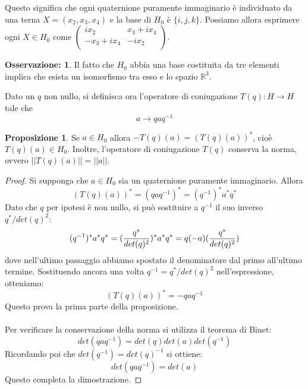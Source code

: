 \documentclass[12pt,a4paper]{report}
\theoremstyle{definition}
\theoremstyle{Theorem}
\newtheorem{Prop}[Def]{Proposizione}
\theoremstyle{definition}
\theoremstyle{definition}
\theoremstyle{definition}
\newtheorem{Obs}[Def]{Osservazione:}
\begin{document}
Questo significa che ogni quaternione puramente immaginario è individuato da una terna $X=(x_2,x_3,x_4)$ e la base di $H_0$ è $\{i,j,k\}$. Possiamo allora esprimere ogni $X\in H_0$ come
$\begin{pmatrix}
	ix_2 & x_3+ix_4\\
	-x_3+ix_4 & -ix_2\\
\end{pmatrix}$.
\begin{Obs} \label{Obs:3.4.1}
	Il fatto che $H_0$ abbia una base costituita da tre elementi implica che esista un isomorfismo tra esso e lo spazio $\mathbb{R}^3$.
\end{Obs}
Dato un $q$ non nullo, si definisca ora l'operatore di coniugazione
$T(q):H\longrightarrow H$ tale che
$$a\longrightarrow qaq^{-1}$$
\begin{Prop}
	Se $a\in H_0$ allora $-T(q)(a)=(T(q)(a))^*$, cioè $T(q)(a)\in H_0$. Inoltre, l'operatore di coniugazione $T(q)$ conserva la norma, ovvero $||T(q)(a)||=||a||$.
\end{Prop}
\begin{proof}
	Si supponga che $a\in H_0$ sia un quaternione puramente immaginario. Allora $$(T(q)(a))^*=(qaq^{-1})^*=(q^{-1})^*a^*q^*$$
	Dato che $q$ per ipotesi è non nullo, si può sostituire a $q^{-1}$ il suo inverso $q^*/det(q)^2$:
	$$(q^{-1})^*a^*q^*=({q^*\over det(q)^2})^*a^*q^*=q(-a)({q^*\over det(q)^2})$$
	dove nell'ultimo passaggio abbiamo spostato il denominatore dal primo all'ultimo termine. Sostituendo ancora una volta $q^{-1}=q^*/det(q)^2$ nell'espressione, otteniamo:
	$$(T(q)(a))^*=-qaq^{-1}$$
	Questo prova la prima parte della proposizione.\\
	\\
	Per verificare la conservazione della norma si utilizza il teorema di Binet:
	$$det(qaq^{-1})=det(q)det(a)det(q^{-1})$$
	Ricordando poi che $det(q^{-1})=det(q)^{-1}$ si ottiene:
	$$det(qaq^{-1})=det(a)$$
	Questo completa la dimostrazione.
\end{proof}
\end{document}
